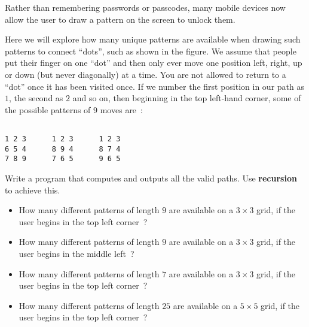 
Rather than remembering passwords or passcodes, many mobile
devices now allow the user to draw a pattern on the screen to
unlock them.
\begin{center}
\end{center}

Here we will explore how many unique patterns are available
when drawing such patterns to connect ``dots'', such as shown in the
figure.
We assume that people put their finger on one ``dot'' and then only ever move
one position left, right, up or down (but never diagonally) at
a time. You are not allowed to return to a ``dot'' once it has
been visited once. If we number the first position in our path as $1$, the
second as $2$ and so on, then beginning in the top left-hand
corner, some of the possible patterns of 9 moves are~:
\begin{verbatim}

1 2 3      1 2 3      1 2 3
6 5 4      8 9 4      8 7 4
7 8 9      7 6 5      9 6 5

\end{verbatim}

\begin{exercise}
Write a program that computes and outputs all the valid paths.
Use \textbf{recursion} to achieve this.
\begin{itemize}
\item How many different patterns of length $9$ are
    available on a $3 \times 3$ grid, if the user begins in
    the top left corner~?

\item How many different patterns of length $9$ are
    available on a $3 \times 3$ grid, if the user begins in
    the middle left~?

\item How many different patterns of length $7$ are
    available on a $3 \times 3$ grid, if the user begins in
    the top left corner~?

\item How many different patterns of length $25$ are
    available on a $5 \times 5$ grid, if the user begins in
    the top left corner~?
\end{itemize}
\end{exercise}
